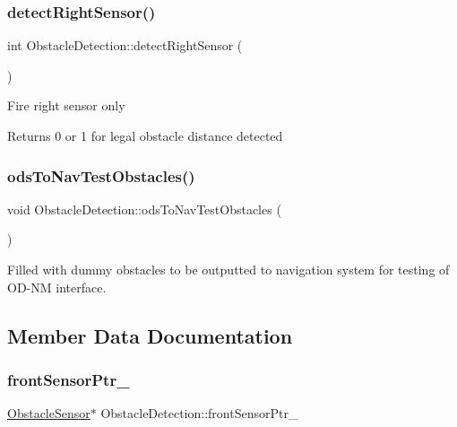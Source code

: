 \subsubsection{\texorpdfstring{detect\+Right\+Sensor()}{detectRightSensor()}}
{\footnotesize\ttfamily int Obstacle\+Detection\+::detect\+Right\+Sensor (\begin{DoxyParamCaption}{ }\end{DoxyParamCaption})\hspace{0.3cm}{\ttfamily [private]}}

Fire right sensor only \begin{DoxyReturn}{Returns}
0 or 1 for legal obstacle distance detected 
\end{DoxyReturn}
\mbox{\label{class_obstacle_detection_a4977cf4929ce5b8ec1b42353df9bd2b7}} 
\subsubsection{\texorpdfstring{ods\+To\+Nav\+Test\+Obstacles()}{odsToNavTestObstacles()}}
{\footnotesize\ttfamily void Obstacle\+Detection\+::ods\+To\+Nav\+Test\+Obstacles (\begin{DoxyParamCaption}{ }\end{DoxyParamCaption})}



Filled with dummy obstacles to be outputted to navigation system for testing of O\+D-\/\+NM interface. 



\subsection{Member Data Documentation}
\mbox{\label{class_obstacle_detection_ab6e8507df02f3b6d9282d0253ac338f3}} 
\subsubsection{\texorpdfstring{front\+Sensor\+Ptr\+\_\+}{frontSensorPtr\_}}
{\footnotesize\ttfamily \mbox{\hyperlink{class_obstacle_sensor}{Obstacle\+Sensor}}$\ast$ Obstacle\+Detection\+::front\+Sensor\+Ptr\+\_\+\hspace{0.3cm}{\ttfamily [private]}}



